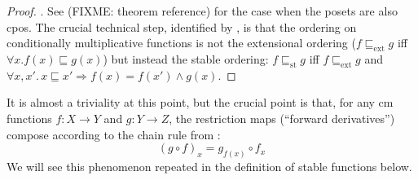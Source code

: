\begin{proof}
  \AGDA. See \citet{amadio-curien} (FIXME: theorem reference) for the
  case when the posets are also cpos. The crucial technical step,
  identified by \citet{berry79}, is that the ordering on conditionally
  multiplicative functions is not the extensional ordering
  ($f \sqsubseteq_{\mathrm{ext}} g$ iff
  $\forall x. f(x) \sqsubseteq g(x)$) but instead the stable ordering:
  $f \sqsubseteq_{\mathrm{st}} g$ iff $f \sqsubseteq_{\mathrm{ext}} g$ and
  $\forall x, x'.\,x \sqsubseteq x' \Rightarrow f(x) = f(x') \land
  g(x)$.
\end{proof}

\begin{remark}
  \label{rem:cm-chain-rule}
  It is almost a triviality at this point, but the crucial point is
  that, for any cm functions $f : X \to Y$ and $g : Y \to Z$, the
  restriction maps (``forward derivatives'') compose according to the
  chain rule from :
  \begin{displaymath}
    (g \circ f)_x = g_{f(x)} \circ f_x
  \end{displaymath}
  We will see this phenomenon repeated in the definition of stable
  functions below.
\end{remark}

